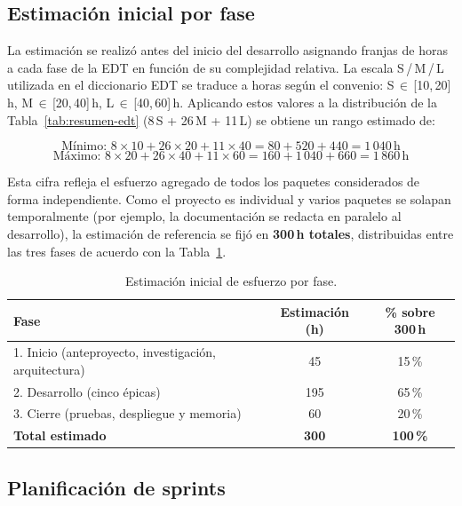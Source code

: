 \subsection{Estimación inicial por fase}

La estimación se realizó antes del inicio del desarrollo asignando franjas de horas a cada fase de la EDT en función de su complejidad relativa. La escala S\,/\,M\,/\,L utilizada en el diccionario EDT se traduce a horas según el convenio: S\,$\in$\,[10,\,20]\,h, M\,$\in$\,[20,\,40]\,h, L\,$\in$\,[40,\,60]\,h. Aplicando estos valores a la distribución de la Tabla~\ref{tab:resumen-edt} (8\,S + 26\,M + 11\,L) se obtiene un rango estimado de:

\[
\text{Mínimo: } 8 \times 10 + 26 \times 20 + 11 \times 40 = 80 + 520 + 440 = 1\,040\,\text{h}
\]
\[
\text{Máximo: } 8 \times 20 + 26 \times 40 + 11 \times 60 = 160 + 1\,040 + 660 = 1\,860\,\text{h}
\]

Esta cifra refleja el esfuerzo agregado de todos los paquetes considerados de forma independiente. Como el proyecto es individual y varios paquetes se solapan temporalmente (por ejemplo, la documentación se redacta en paralelo al desarrollo), la estimación de referencia se fijó en \textbf{300\,h totales}, distribuidas entre las tres fases de acuerdo con la Tabla~\ref{tab:estimacion-horas}.

\begin{table}[hbtp]
\centering
\small
\begin{tabular}{|l|c|c|}
\hline
\textbf{Fase} & \textbf{Estimación (h)} & \textbf{\% sobre 300\,h} \\ \hline
1. Inicio (anteproyecto, investigación, arquitectura) &  45 & 15\,\% \\ \hline
2. Desarrollo (cinco épicas)                          & 195 & 65\,\% \\ \hline
3. Cierre (pruebas, despliegue y memoria)              &  60 & 20\,\% \\ \hline
\textbf{Total estimado}                               & \textbf{300} & \textbf{100\,\%} \\ \hline
\end{tabular}
\caption{Estimación inicial de esfuerzo por fase.}
\label{tab:estimacion-horas}
\end{table}

\subsection{Planificación de sprints}

